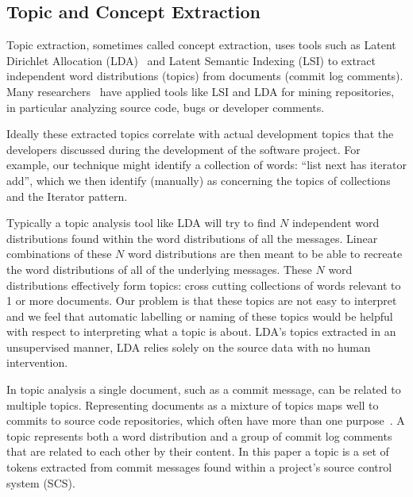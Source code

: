 \documentclass[10pt, conference, compsocconf]{IEEEtran}
\begin{document}
\subsection{Topic and Concept Extraction}
Topic extraction, sometimes called concept extraction, uses tools such as Latent Dirichlet Allocation (LDA)~\cite{Blei2003} and Latent Semantic Indexing (LSI) to extract
independent word distributions (topics) from
	documents (commit log comments). Many researchers~\cite{marcus04wcre,Poshyvanyk2007,lukins08wcre,Linstead2007} have applied tools like LSI and LDA for mining repositories, in particular analyzing source code, bugs or developer comments.
\begin{comments}
Ideally these extracted topics 
correlate with actual development topics that the developers discussed
during the development of the software project. For example, our technique might identify a collection of words: ``list next has iterator add'', which we then identify (manually) as concerning the topics of collections and the Iterator pattern.
\end{comments}

Typically a topic analysis tool like LDA will try to find $N$ independent word distributions found within the word distributions of all the messages. Linear combinations of these $N$ word distributions are then meant to be able to recreate the word distributions of all of the underlying messages. These $N$ word distributions effectively form topics: cross cutting collections of words relevant to 1 or more documents. Our problem is that these topics are not easy to interpret and we feel that automatic labelling or naming of these topics would be helpful with respect to interpreting what a topic is about. LDA's topics extracted in an unsupervised manner, LDA relies solely on the source data with no human intervention.

In topic analysis a single document, such as a commit message, can be related to multiple topics. Representing documents as a mixture of topics maps well to commits to source code repositories, which often have more than one purpose~\cite{hindle09icsm}.  A topic represents both a word distribution and a group of commit log comments that are related to each other by their content.  In this paper a topic is a set of tokens extracted from commit messages found within a project's source control system (SCS).

\begin{comment}
In this paper we use LDA to identify topics.  LDA works by creating topic models for each period. A topic model is a statistical summary of the important subjects for that dataset.  The input to the algorithm is a set of documents, with contents treated as a bag of words, and a parameter to set the number of topics to generate. The algorithm returns a word-document matrix relating the occurrence frequency of a 
 The idea is similar to other IR approaches like TF/IDF (term frequency/inverse document frequency), which find uncommon words that aren't found in other wordlists. These approaches are unsupervised in that they rely solely on the source data with no human intervention.
\end{comment}
\end{document}
